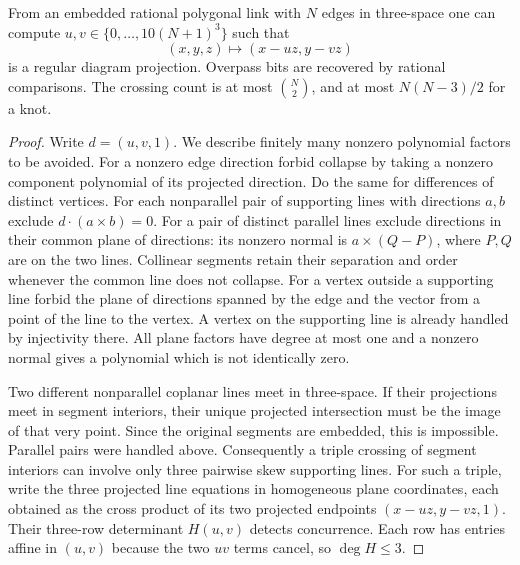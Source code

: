 \begin{theorem}\label{th:projection}
From an embedded rational polygonal link with $N$ edges in three-space one can compute $u,v\in\{0,\ldots,10(N+1)^3\}$ such that
\[
             (x,y,z)\longmapsto (x-uz,y-vz)
\]
is a regular diagram projection. Overpass bits are recovered by rational comparisons. The crossing count is at most $\binom{N}{2}$, and at most $N(N-3)/2$ for a knot.
\end{theorem}
\begin{proof}
Write $d=(u,v,1)$. We describe finitely many nonzero polynomial factors to be avoided. For a nonzero edge direction forbid collapse by taking a nonzero component polynomial of its projected direction. Do the same for differences of distinct vertices. For each nonparallel pair of supporting lines with directions $a,b$ exclude $d\cdot(a\times b)=0$. For a pair of distinct parallel lines exclude directions in their common plane of directions: its nonzero normal is $a\times(Q-P)$, where $P,Q$ are on the two lines. Collinear segments retain their separation and order whenever the common line does not collapse. For a vertex outside a supporting line forbid the plane of directions spanned by the edge and the vector from a point of the line to the vertex. A vertex on the supporting line is already handled by injectivity there. All plane factors have degree at most one and a nonzero normal gives a polynomial which is not identically zero.

Two different nonparallel coplanar lines meet in three-space. If their projections meet in segment interiors, their unique projected intersection must be the image of that very point. Since the original segments are embedded, this is impossible. Parallel pairs were handled above. Consequently a triple crossing of segment interiors can involve only three pairwise skew supporting lines. For such a triple, write the three projected line equations in homogeneous plane coordinates, each obtained as the cross product of its two projected endpoints $(x-uz,y-vz,1)$. Their three-row determinant $H(u,v)$ detects concurrence. Each row has entries affine in $(u,v)$ because the two $uv$ terms cancel, so $\deg H\le3$.


\end{proof}
